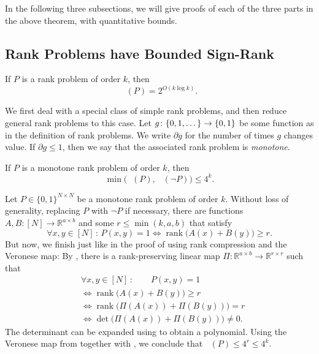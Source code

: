 \documentclass[conference]{IEEEtran}
\DeclareMathOperator{\signrank}{rank_\pm}
\DeclareMathOperator{\suprank}{rank_0}
\DeclareMathOperator{\rank}{rank}
\newcommand{\R}{\mathbb{R}}
\begin{document}
In the following three subsections, we will give proofs of each of the three parts in the above
theorem, with quantitative bounds.

\subsection{Rank Problems have Bounded Sign-Rank}

\begin{lemma}\label{lemma:signrank-rank}
	If $P$ is a rank problem of order $k$, then
	\[
	\signrank(P) = 2^{O(k\log k)}.
	\]
\end{lemma}

We first deal with a special class of simple rank problems, and then reduce general rank problems to this case. Let $g \colon \{0, 1, \dotsc\} \to \{0,1\}$ be some function as in the definition of rank problems. We write $\partial g$ for the number of times $g$ changes value. If $\partial g \leq 1$, then we say that the associated rank problem is \emph{monotone}.

\begin{lemma}\label{lemma:suprank-monotone}
	If $P$ is a monotone rank problem of order $k$, then 
	\[
	\min\!\Big(\suprank(P),\ \suprank(\neg P)\Big) \leq 4^k.
	\]
\end{lemma}

\begin{IEEEproof}
	Let $P\in\{0,1\}^{N\times N}$ be a monotone rank problem of order $k$. Without loss of generality, replacing $P$ with $\neg P$ if necessary, there are functions $A,B\colon [N] \to \R^{a\times b}$ and some $r\leq \min(k,a,b)$ that satisfy
	\[
	\forall x,y\in[N]\,\colon\, P(x,y) = 1 \Leftrightarrow \rank\!\big(A(x)+B(y)\big) \geq r.
	\]
	But now, we finish just like in the proof of  using rank compression and the Veronese map: By , there is a rank-preserving linear map $\Pi:\R^{a\times b}\to \R^{r\times r}$ such that
	\begin{align*}
		&\forall x,y\in[N]\,\colon\qquad P(x,y) = 1\\
        &\iff \rank\!\big(A(x)+B(y)\big) \geq r\\
		&\iff \rank\!\Big(\Pi(A(x))+\Pi(B(y))\Big) = r\\
		&\iff \det\!\Big(\Pi(A(x))+\Pi(B(y))\Big) \neq 0.
	\end{align*}
	The determinant can be expanded using  to obtain a polynomial. Using the Veronese map from  together with , we conclude that $\suprank(P)\leq 4^r\leq 4^k$.
\end{IEEEproof}
\end{document}
